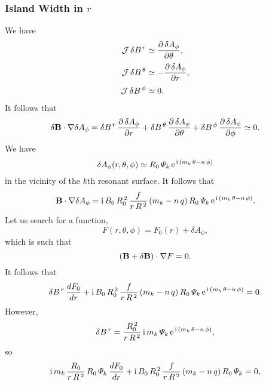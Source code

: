 \documentclass[12pt]{article}
\begin{document}
\subsubsection{Island Width in $r$}
We have
\begin{align}
{\cal J}\,\delta B^{\,r} &\simeq \frac{\partial \,\delta A_\phi}{\partial\theta},\\[0.5ex]
{\cal J}\,\delta B^{\,\theta} &\simeq -\frac{\partial\,\delta A_\phi}{\partial r},\\[0.5ex]
{\cal J}\,\delta B^{\,\phi} &\simeq 0.
\end{align}
It follows that
\begin{equation}
\delta {\bf B}\cdot\nabla\delta A_\phi = \delta B^{\,r}\,\frac{\partial\,\delta A_\phi}{\partial r}+  \delta B^{\,\theta}\,\frac{\partial\,\delta A_\phi}{\partial \theta}+  \delta B^{\,\phi}\,\frac{\partial\,\delta A_\phi}{\partial \phi}\simeq 0. 
\end{equation}
We have
\begin{equation}
\delta A_\phi (r,\theta,\phi)\simeq R_0\,{\mit\Psi}_k\,{\rm e}^{\,{\rm i}\,(
m_k\,\theta - n\,\phi)}
\end{equation}
in the vicinity of the $k$th resonant surface. It follows that
\begin{equation}
{\bf B}\cdot\nabla \delta A_\phi = {\rm i}\,B_0\,R_0^{\,2}\,\frac{f}{r\,R^{\,2}}\,(m_k-n\,q)\,R_0\,{\mit\Psi}_k\,{\rm e}^{\,{\rm i}\,(
m_k\,\theta - n\,\phi)}.
\end{equation}
Let us search for a function,
\begin{equation}
F(r,\theta,\phi)= F_0(r) + \delta A_\phi,
\end{equation}
which is such that
\begin{equation}
({\bf B}+\delta {\bf B})\cdot\nabla F = 0.
\end{equation}
It follows that
\begin{equation}
\delta B^{\,r}\,\frac{dF_0}{dr} +{\rm i}\,B_0\,R_0^{\,2}\,\frac{f}{r\,R^{\,2}}\,(m_k-n\,q)\,R_0\,{\mit\Psi}_k\,{\rm e}^{\,{\rm i}\,(m_k\,\theta - n\,\phi)}=0.
\end{equation}
However,
\begin{equation}
\delta B^{\,r} = \frac{R_0^{\,2}}{r\,R^{\,2}}\,{\rm i}\,m_k\,{\mit\Psi}_k\,{\rm e}^{\,{\rm i}\,(m_k\,\theta - n\,\phi)},
\end{equation}
so
\begin{equation}
{\rm i}\,m_k\,\frac{R_0}{r\,R^{\,2}}\,R_0\,{\mit\Psi}_k\,\frac{dF_0}{dr}+{\rm i}\,B_0\,R_0^{\,2}\,\frac{f}{r\,R^{\,2}}\,(m_k-n\,q)\,R_0\,{\mit\Psi}_k=0,
\end{equation}
\end{document}
